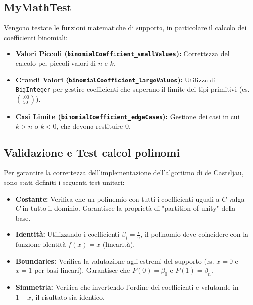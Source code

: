 \subsection{MyMathTest}
Vengono testate le funzioni matematiche di supporto, in particolare il calcolo dei coefficienti binomiali:
\begin{itemize}
    \item \textbf{Valori Piccoli (\texttt{binomialCoefficient\_smallValues}):} Correttezza del calcolo per piccoli valori di $n$ e $k$.
    \item \textbf{Grandi Valori (\texttt{binomialCoefficient\_largeValues}):} Utilizzo di \texttt{BigInteger} per gestire coefficienti che superano il limite dei tipi primitivi (es. $\binom{100}{50}$).
    \item \textbf{Casi Limite (\texttt{binomialCoefficient\_edgeCases}):} Gestione dei casi in cui $k > n$ o $k < 0$, che devono restituire $0$.
\end{itemize}


\subsection{Validazione e Test calcol polinomi}
Per garantire la correttezza dell'implementazione dell'algoritmo di de Casteljau, sono stati definiti i seguenti test unitari:

\begin{itemize}
    \item \textbf{Costante:} Verifica che un polinomio con tutti i coefficienti uguali a $C$ valga $C$ in tutto il dominio. Garantisce la proprietà di "partition of unity" della base.
    \item \textbf{Identità:} Utilizzando i coefficienti $\beta_i = \frac{i}{n}$, il polinomio deve coincidere con la funzione identità $f(x)=x$ (linearità).
    \item \textbf{Boundaries:} Verifica la valutazione agli estremi del supporto (es. $x=0$ e $x=1$ per basi lineari). Garantisce che $P(0) = \beta_0$ e $P(1) = \beta_n$.
    \item \textbf{Simmetria:} Verifica che invertendo l'ordine dei coefficienti e valutando in $1-x$, il risultato sia identico.
\end{itemize}

